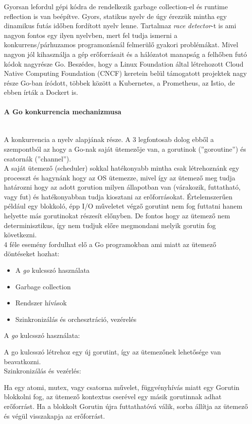 Gyorsan lefordul gépi kódra de rendelkezik garbage collection-el és runtime reflection is van beépítve.
Gyors, statikus nyelv de úgy érezzük mintha egy dinamikus futás időben fordított nyelv lenne.
Tartalmaz \textit{race detector}-t is ami nagyon fontos egy ilyen nyelvben, mert fel tudja ismerni a konkurrens/párhuzamos programozásnál felmerülő gyakori problémákat.
Mivel nagyon jól kihasználja a gép erőforrásait és a hálózatot manapság a felhőben futó kódok nagyrésze Go.
Beszédes, hogy a Linux Foundation által létrehozott Cloud Native Computing Foundation (CNCF) keretein
belül támogatott projektek nagy része Go-ban íródott, többek között a Kubernetes, a Prometheus, az Istio, de ebben írták a Dockert is.\\


\paragraph{A Go konkurrencia mechanizmusa} \mbox{} \\
A konkurrencia a nyelv alapjának része. A 3 legfontosab dolog ebből a szempontból az hogy a Go-nak saját ütemezője van,
a gorutinok (''goroutine'') és csatornák (''channel'').\\
A saját ütemező (scheduler) sokkal hatékonyabb mintha csak létrehoznánk egy processzt és hagynánk hogy az OS ütemezze,
mivel így az ütemező meg tudja határozni hogy az adott gorution milyen állapotban van (várakozik, futtatható, vagy fut) és hatékonyabban tudja
kiosztani az erőforrásokat. Értelemszerűen például egy blokkoló, épp I/O műveletet végző gorutint nem fog futtatni hanem helyette más gorutinokat részesít
előnyben. De fontos hogy az ütemező nem determinisztikus, így nem tudjuk előre megmondani melyik gorutin fog következni.\\
4 féle esemény fordulhat elő a Go programokban ami miatt az ütemező döntéseket hozhat:
\begin{itemize}
    \item A \emph{go} kulcsszó használata
    \item Garbage collection
    \item Rendszer hívások
    \item Szinkronizálás és orchesztráció, vezérelés
\end{itemize}
A \emph{go} kulcsszó használata: \par
A go kulcsszó létrehoz egy új gorutint, így az ütemezőnek lehetősége van beavatkozni.\\
Szinkronizálás és vezérlés: \par
Ha egy atomi, mutex, vagy csatorna művelet, függvényhívás miatt egy Gorutin blokkolni fog, az ütemező kontextus cserével egy másik gorutinnak adhat erőforrást. Ha a blokkolt Gorutin újra futtathatóvá válik, sorba állítja az ütemező és végül visszakapja az erőforrást.\\

